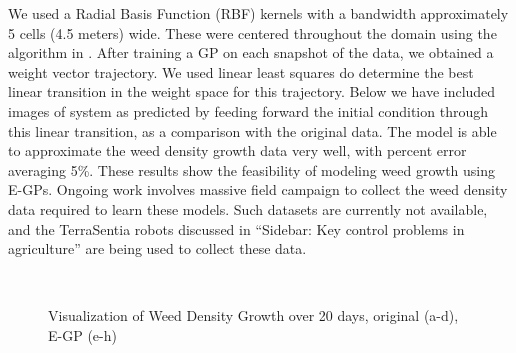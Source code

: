 We used a Radial Basis Function (RBF) kernels with a bandwidth approximately 5 cells (4.5 meters) wide. These were centered throughout the domain using the algorithm in \cite{csato2001sparse}. After training a GP on each snapshot of the data, we obtained a weight vector trajectory. We used linear least squares do determine the best linear transition in the weight space for this trajectory. Below we have included images of system as predicted by feeding forward the initial condition through this linear transition, as a comparison with the original data. The model is able to approximate the weed density growth data very well, with percent error averaging 5\%. These results show the feasibility of modeling weed growth using E-GPs. Ongoing work involves massive field campaign to collect the weed density data required to learn these models. Such datasets are currently not available, and the TerraSentia robots discussed in ``Sidebar: Key control problems in agriculture'' are being used to collect these data.

\begin{figure*}[h] %
	\centering
	\\
	
	\caption{Visualization of Weed Density Growth over 20 days, original (a-d), E-GP (e-h)}
	\label{fig:weed_egp}
\end{figure*}



